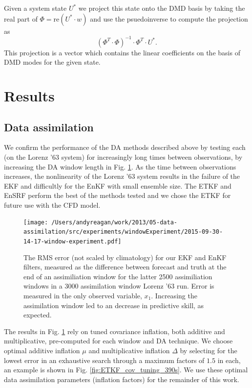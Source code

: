 Given a system state $U^*$ we project this state onto the DMD basis by taking the real part of $\Phi = \text{re}\left (U^*\cdot w\right)$ and use the psuedoinverse to compute the projection as $$(\Phi^T \cdot \Phi)^{-1} \cdot \Phi ^T \cdot U^*.$$
This projection is a vector which contains the linear coefficients on the basis of DMD modes for the given state.

\section{Results}

\subsection{Data assimilation}

We confirm the performance of the DA methods described above by testing each (on the Lorenz '63 system) for increasingly long times between observations, by increasing the DA window length in Fig. \ref{fig:window_test}.
As the time between observations increases, the nonlinearity of the Lorenz '63 system results in the failure of the EKF and difficultly for the EnKF with small ensemble size.
The ETKF and EnSRF perform the best of the methods tested and we chose the ETKF for future use with the CFD model.

\begin{figure}[h]
  \centering
  \texttt{[image: /Users/andyreagan/work/2013/05-data-assimilation/src/experiments/windowExperiment/2015-09-30-14-17-window-experiment.pdf]}
  \caption[The RMS error is reported for our EKF and EnKF filters]{
    The RMS error (not scaled by climatology) for our EKF and EnKF filters, measured as the difference between forecast and truth at the end of an assimiliation window for the latter 2500 assimiliation windows in a 3000 assimilation window Lorenz '63 run.
    Error is measured in the only observed variable, $x_1$.
    Increasing the assimilation window led to an decrease in predictive skill, as expected.
  }
  \label{fig:window_test}
\end{figure}

The results in Fig. \ref{fig:window_test} rely on tuned covariance inflation, both additive and multiplicative, pre-computed for each window and DA technique.
We choose optimal additive inflation $\mu$ and multiplicative inflation $\Delta$ by selecting for the lowest error in an exhaustive search through a maximum factors of $1.5$ in each, an example is shown in Fig. \ref{fig:ETKF_cov_tuning_390s}.
We use these optimal data assimilation parameters (inflation factors) for the remainder of this work.

